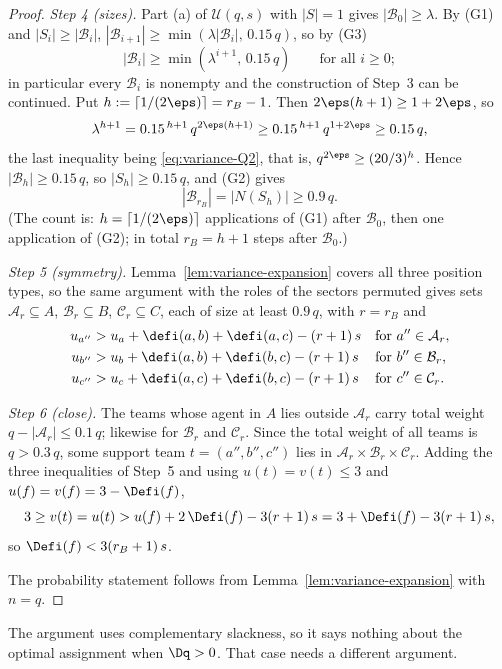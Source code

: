 \begin{proof}
\emph{Step 4 (sizes).} Part (a) of $\mathcal U(q,s)$ with $|S|=1$ gives
$|\mathcal B_0|\ge\lambda$. By (G1) and $|S_i|\ge|\mathcal B_i|$,
$|\mathcal B_{i+1}|\ge\min(\lambda|\mathcal B_i|,\,0.15\,q)$, so by (G3)
\[
|\mathcal B_i|\ge\min(\lambda^{i+1},\,0.15\,q)\qquad\text{for all }i\ge0;
\]
in particular every $\mathcal B_i$ is nonempty and the construction of Step~3 can be
continued. Put $h:=\lceil1/(2\eps)\rceil=r_B-1$. Then $2\eps(h+1)\ge1+2\eps$, so
\[
\lambda^{h+1}=0.15^{\,h+1}\,q^{2\eps(h+1)}\ge0.15^{\,h+1}\,q^{1+2\eps}\ge0.15\,q,
\]
the last inequality being \eqref{eq:variance-Q2}, that is, $q^{2\eps}\ge(20/3)^h$. Hence
$|\mathcal B_h|\ge0.15\,q$, so $|S_h|\ge0.15\,q$, and (G2) gives
\[
|\mathcal B_{r_B}|=|N(S_h)|\ge0.9\,q .
\]
(The count is: $h=\lceil1/(2\eps)\rceil$ applications of (G1) after $\mathcal B_0$, then
one application of (G2); in total $r_B=h+1$ steps after $\mathcal B_0$.)

\emph{Step 5 (symmetry).} Lemma~\ref{lem:variance-expansion} covers all three position
types, so the same argument with the roles of the sectors permuted gives sets
$\mathcal A_r\subseteq A$, $\mathcal B_r\subseteq B$, $\mathcal C_r\subseteq C$, each of
size at least $0.9\,q$, with $r=r_B$ and
\begin{align*}
u_{a''}&>u_a+\defi(a,b)+\defi(a,c)-(r+1)\,s&&\text{for }a''\in\mathcal A_r,\\
u_{b''}&>u_b+\defi(a,b)+\defi(b,c)-(r+1)\,s&&\text{for }b''\in\mathcal B_r,\\
u_{c''}&>u_c+\defi(a,c)+\defi(b,c)-(r+1)\,s&&\text{for }c''\in\mathcal C_r .
\end{align*}

\emph{Step 6 (close).} The teams whose agent in $A$ lies outside $\mathcal A_r$ carry
total weight $q-|\mathcal A_r|\le0.1\,q$; likewise for $\mathcal B_r$ and $\mathcal C_r$.
Since the total weight of all teams is $q>0.3\,q$, some support team $t=(a'',b'',c'')$
lies in $\mathcal A_r\times\mathcal B_r\times\mathcal C_r$. Adding the three inequalities
of Step~5 and using $u(t)=v(t)\le3$ and $u(f)=v(f)=3-\Defi(f)$,
\[
3\ge v(t)=u(t)>u(f)+2\,\Defi(f)-3(r+1)\,s=3+\Defi(f)-3(r+1)\,s,
\]
so $\Defi(f)<3(r_B+1)\,s$.

The probability statement follows from Lemma~\ref{lem:variance-expansion} with $n=q$.
\end{proof}

The argument uses complementary slackness, so it says nothing about the optimal assignment
when $\Dq>0$. That case needs a different argument.

